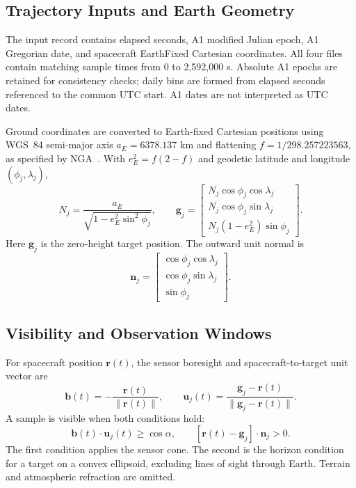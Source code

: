 \documentclass[conf]{new-aiaa}
\begin{document}
\subsection{Trajectory Inputs and Earth Geometry}
The input record contains elapsed seconds, A1 modified Julian epoch,
A1 Gregorian date, and spacecraft EarthFixed Cartesian coordinates.
All four files contain matching sample times from 0 to 2,592,000 s.
Absolute A1 epochs are retained for consistency checks; daily bins are
formed from elapsed seconds referenced to the common UTC start. A1 dates
are not interpreted as UTC dates.

Ground coordinates are converted to Earth-fixed Cartesian positions using
WGS~84 semi-major axis $a_E=6378.137$ km and flattening
$f=1/298.257223563$, as specified by NGA~\cite{wgs84}. With
$e_E^2=f(2-f)$ and geodetic latitude and longitude $(\phi_j,\lambda_j)$,
\begin{equation}
N_j=\frac{a_E}{\sqrt{1-e_E^2\sin^2\phi_j}},\qquad
\mathbf{g}_j=\begin{bmatrix}
N_j\cos\phi_j\cos\lambda_j\\
N_j\cos\phi_j\sin\lambda_j\\
N_j(1-e_E^2)\sin\phi_j
\end{bmatrix}.
\label{eq:ground}
\end{equation}
Here $\mathbf{g}_j$ is the zero-height target position. The outward unit
normal is
\begin{equation}
\mathbf{n}_j=\begin{bmatrix}
\cos\phi_j\cos\lambda_j\\
\cos\phi_j\sin\lambda_j\\
\sin\phi_j
\end{bmatrix}.
\label{eq:normal}
\end{equation}

\subsection{Visibility and Observation Windows}
For spacecraft position $\mathbf{r}(t)$, the sensor boresight and
spacecraft-to-target unit vector are
\begin{equation}
\mathbf{b}(t)=-\frac{\mathbf{r}(t)}{\|\mathbf{r}(t)\|},\qquad
\mathbf{u}_j(t)=\frac{\mathbf{g}_j-\mathbf{r}(t)}{\|\mathbf{g}_j-\mathbf{r}(t)\|}.
\end{equation}
A sample is visible when both conditions hold:
\begin{equation}
\mathbf{b}(t)\cdot\mathbf{u}_j(t)\geq\cos\alpha,
\qquad [\mathbf{r}(t)-\mathbf{g}_j]\cdot\mathbf{n}_j>0.
\label{eq:visible}
\end{equation}
The first condition applies the sensor cone. The second is the horizon
condition for a target on a convex ellipsoid, excluding lines of sight
through Earth. Terrain and atmospheric refraction are omitted.
\end{document}

